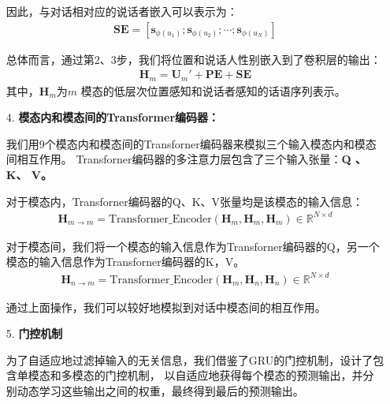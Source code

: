 \documentclass[11pt]{article}
\begin{document}
\begin{enumerate}
                因此，与对话相对应的说话者嵌入可以表示为：
                \begin{align}
                    \textbf{SE}= [\textbf{s}_{\phi (u_1)};\textbf{s}_{\phi (u_2)};\cdots ;\textbf{s}_{\phi (u_N)} ]
                \end{align}
                
                总体而言，通过第2、3步，我们将位置和说话人性别嵌入到了卷积层的输出：
                \begin{align}
                    \textbf{H}_m = \textbf{U}_m'+\textbf{PE}+\textbf{SE}
                \end{align}
                其中，$\textbf{H}_m $为$m$ 模态的低层次位置感知和说话者感知的话语序列表示。
                
                \item [4. ]\textbf{模态内和模态间的Transformer编码器：}\par
                我们用9个模态内和模态间的Transforner编码器来模拟三个输入模态内和模态间相互作用。
                Transforner编码器的多注意力层包含了三个输入张量：\textbf{Q 、K、 V。}
                
                对于模态内，Transforner编码器的Q、K、V张量均是该模态的输入信息：
                \begin{align}
                    \textbf{H}_{m\rightarrow m} = \textrm{Transformer\_Encoder}(\textbf{H}_{m},\textbf{H}_{m},\textbf{H}_{m}) \in \mathbb{R}^{N\times d}
                \end{align}
                
                对于模态间，我们将一个模态的输入信息作为Transforner编码器的Q，另一个模态的输入信息作为Transforner编码器的K，V。
                \begin{align}
                    \textbf{H}_{n\rightarrow m} = \textrm{Transformer\_Encoder}(\textbf{H}_{m},\textbf{H}_{n},\textbf{H}_{n}) \in \mathbb{R}^{N\times d}
                \end{align}

                通过上面操作，我们可以较好地模拟到对话中模态间的相互作用。
                
                \item [5. ]\textbf{门控机制}\par
                为了自适应地过滤掉输入的无关信息，我们借鉴了GRU的门控机制，设计了包含单模态和多模态的门控机制，
                以自适应地获得每个模态的预测输出，并分别动态学习这些输出之间的权重，最终得到最后的预测输出。
                

\end{enumerate}
\end{document}
